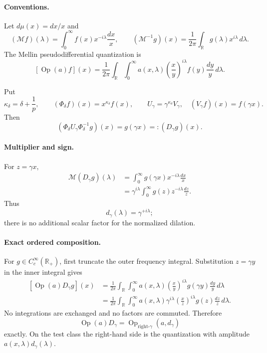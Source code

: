 \paragraph{Conventions.}
Let \(d\mu(x)=dx/x\) and
\[
 (\mathcal Mf)(\lambda)
 =\int_0^\infty f(x)x^{-i\lambda}\frac{dx}{x},
 \qquad
 (\mathcal M^{-1}g)(x)
 =\frac1{2\pi}\int_{\mathbb R}g(\lambda)x^{i\lambda}\,d\lambda.
\]
The Mellin pseudodifferential quantization is
\[
 [\operatorname{Op}(a)f](x)
 =\frac1{2\pi}\int_{\mathbb R}\int_0^\infty
 a(x,\lambda)\left(\frac{x}{y}\right)^{i\lambda}
 f(y)\frac{dy}{y}\,d\lambda.
\]

Put
\[
 \kappa_\delta=\delta+\frac1p,
 \qquad
 (\Phi_\delta f)(x)=x^{\kappa_\delta}f(x),
 \qquad
 U_\gamma=\gamma^{\kappa_\delta}V_\gamma,
 \quad
 (V_\gamma f)(x)=f(\gamma x).
\]
Then
\[
 (\Phi_\delta U_\gamma\Phi_\delta^{-1}g)(x)=g(\gamma x)
 =:(D_\gamma g)(x).
\]

\paragraph{Multiplier and sign.}
For \(z=\gamma x\),
\[
\begin{aligned}
 \mathcal M(D_\gamma g)(\lambda)
 &=\int_0^\infty g(\gamma x)x^{-i\lambda}\frac{dx}{x}\\
 &=\gamma^{i\lambda}
   \int_0^\infty g(z)z^{-i\lambda}\frac{dz}{z}.
\end{aligned}
\]
Thus
\[
 d_\gamma(\lambda)=\gamma^{+i\lambda};
\]
there is no additional scalar factor for the normalized dilation.

\paragraph{Exact ordered composition.}
For \(g\in C_c^\infty(\mathbb R_+)\), first truncate the outer frequency
integral.  Substitution \(z=\gamma y\) in the inner integral gives
\[
\begin{aligned}
 [\operatorname{Op}(a)D_\gamma g](x)
 &=\frac1{2\pi}\int_{\mathbb R}\int_0^\infty
 a(x,\lambda)\left(\frac{x}{y}\right)^{i\lambda}
 g(\gamma y)\frac{dy}{y}\,d\lambda\\
 &=\frac1{2\pi}\int_{\mathbb R}\int_0^\infty
 a(x,\lambda)\gamma^{i\lambda}
 \left(\frac{x}{z}\right)^{i\lambda}
 g(z)\frac{dz}{z}\,d\lambda.
\end{aligned}
\]
No integrations are exchanged and no factors are commuted.  Therefore
\[
 \boxed{
 \operatorname{Op}(a)D_\gamma
 =\operatorname{Op}_{\mathrm{right}\text{-}\gamma}
   (a,d_\gamma)
 }
\]
exactly.  On the test class the right-hand side is the quantization with
amplitude \(a(x,\lambda)d_\gamma(\lambda)\).

